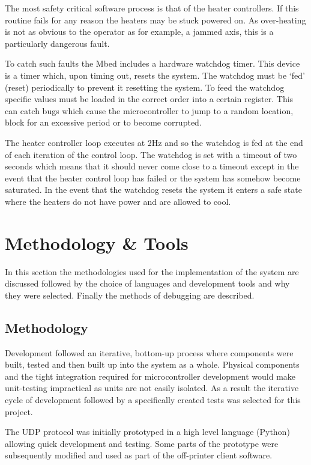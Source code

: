 			The most safety critical software process is that of the heater
			controllers. If this routine fails for any reason the heaters may be stuck
			powered on. As over-heating is not as obvious to the operator as for
			example, a jammed axis, this is a particularly dangerous fault.
			
			To catch such faults the Mbed includes a hardware watchdog timer. This
			device is a timer which, upon timing out, resets the system. The watchdog
			must be `fed' (reset) periodically to prevent it resetting the system. To
			feed the watchdog specific values must be loaded in the correct order into
			a certain register. This can catch bugs which cause the microcontroller to
			jump to a random location, block for an excessive period or to become
			corrupted.
			
			The heater controller loop executes at 2Hz and so the watchdog is fed at
			the end of each iteration of the control loop. The watchdog is set with a
			timeout of two seconds which means that it should never come close to a
			timeout except in the event that the heater control loop has failed or the
			system has somehow become saturated. In the event that the watchdog resets
			the system it enters a safe state where the heaters do not have power and
			are allowed to cool.
	
	\section{Methodology \& Tools}
		
		In this section the methodologies used for the implementation of the system
		are discussed followed by the choice of languages and development tools and
		why they were selected. Finally the methods of debugging are described.
		
		\subsection{Methodology}
		
			Development followed an iterative, bottom-up process where components were
			built, tested and then built up into the system as a whole. Physical
			components and the tight integration required for microcontroller
			development would make unit-testing impractical as units are not easily
			isolated. As a result the iterative cycle of development followed by a
			specifically created tests was selected for this project.
			
			The UDP protocol was initially prototyped in a high level language
			(Python) allowing quick development and testing. Some parts of the
			prototype were subsequently modified and used as part of the off-printer
			client software.
			
